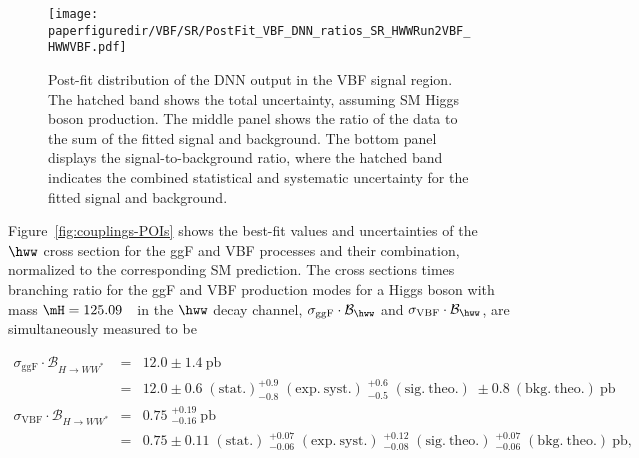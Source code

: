 \begin{figure}[htb]
\centering
\texttt{[image: \\paperfiguredir/VBF/SR/PostFit\_VBF\_DNN\_ratios\_SR\_HWWRun2VBF\_HWWVBF.pdf]}
\caption{
  Post-fit distribution of the DNN output in the VBF signal region.
  The hatched band shows the total uncertainty, assuming SM Higgs boson production.
  The middle panel shows the ratio of the data to the sum of the fitted signal and background.
  The bottom panel displays the signal-to-background ratio, where the hatched band indicates the combined statistical and systematic uncertainty for the fitted signal and background.
}
\label{fig:VBF_DNN}
\end{figure}



Figure~\ref{fig:couplings-POIs} shows the best-fit values and uncertainties of the $\hww$ cross section for the ggF and VBF processes and their combination, normalized to the corresponding SM prediction.
The cross sections times branching ratio for the ggF and VBF production modes for a Higgs boson with mass $\mH=125.09$~\GeV\ in the $\hww$ decay channel, $\sigma_{\mathrm{ggF}} \cdot \mathcal{B}_{\hww}$ and $\sigma_{\mathrm{VBF}} \cdot \mathcal{B}_{\hww}$, are simultaneously measured to be

\begin{eqnarray*}
\sigma_{\mathrm{ggF}} \cdot \mathcal{B}_{H \to WW^{\ast}} &=& 12.0 \pm 1.4~\mathrm{pb} \\
&=& 12.0 \pm 0.6\;(\mathrm{stat.}) ^{+0.9}_{-0.8}\;(\mathrm{exp.~syst.})\;^{+0.6}_{-0.5}\;(\mathrm{sig.~theo.})\; \pm 0.8~(\mathrm{bkg.~theo.})~\mathrm{pb} \\
\sigma_{\mathrm{VBF}} \cdot \mathcal{B}_{H \to WW^{\ast}} &=& 0.75\;^{+0.19}_{-0.16}~\mathrm{pb} \\
&=& 0.75 \pm 0.11\;(\mathrm{stat.})\;^{+0.07}_{-0.06}\;(\mathrm{exp.~syst.})\;^{+0.12}_{-0.08}\;(\mathrm{sig.~theo.})\;^{+0.07}_{-0.06}\;(\mathrm{bkg.~theo.})~\mathrm{pb},
\end{eqnarray*}


